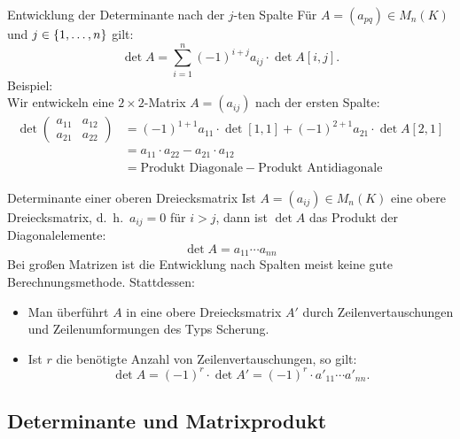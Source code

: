 \documentclass[main.tex]{subfiles}
\begin{document}
\begin{karte}{Entwicklung der Determinante nach der \(j\)-ten Spalte}
    Für \(A = (a_{pq}) \in M_n(K)\) und \(j \in \{1, \ldots ,n\}\) gilt:
    \[\det A = \sum_{i=1}^n {(-1)}^{i+j}a_{ij} \cdot \det A[i,j].\]
    Beispiel: \\
    Wir entwickeln eine \(2 \times 2\)-Matrix \(A = (a_{ij})\) nach der
    ersten Spalte: 
    \[ \begin{split}
        \det 
        \begin{pmatrix}
        a_{11} & a_{12} \\
        a_{21} & a_{22}    
         \end{pmatrix} 
    & = {(-1)}^{1+1}a_{11} \cdot \det [1,1] + (-1)^{2+1}a_{21} \cdot \det A[2,1] \\
    & = a_{11} \cdot a_{22} - a_{21} \cdot a_{12}\\
    & = \text{Produkt Diagonale} - \text{Produkt Antidiagonale}
    \end{split} 
    \]
\end{karte}
\begin{karte}{Determinante einer oberen Dreiecksmatrix} 
    Ist \(A = (a_{ij}) \in M_n(K)\) eine obere Dreiecksmatrix, d.\ h.\ 
    \(a_{ij} = 0\) für \(i > j\), dann ist \(\det A\) das Produkt der 
    Diagonalelemente: 
    \[\det A = a_{11} \cdots a_{nn}\]
    Bei großen Matrizen ist die Entwicklung nach Spalten meist keine 
    gute Berechnungsmethode. Stattdessen: 
    \begin{itemize}
       \item Man überführt \(A\) in  eine obere Dreiecksmatrix 
       \(A'\) durch Zeilenvertauschungen und Zeilenumformungen des 
       Typs Scherung.
       \item Ist \(r\) die benötigte Anzahl von Zeilenvertauschungen, so gilt:
       \[\det A = {(-1)}^r \cdot \det A' = {(-1)}^r \cdot a'_{11} \cdots a'_{nn} .\]
    \end{itemize}
\end{karte}

\subsection*{Determinante und Matrixprodukt}
\end{document}
